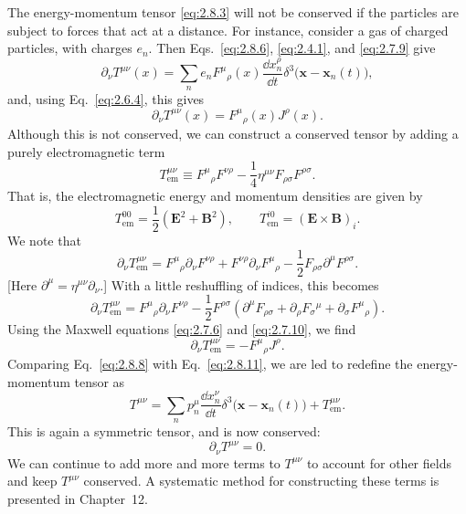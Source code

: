 The energy-momentum tensor \eqref{eq:2.8.3} will not be conserved if the
particles are subject to forces that act at a distance. For instance, consider
a gas of charged particles, with charges \(e_n\). Then
Eqs.~\eqref{eq:2.8.6}, \eqref{eq:2.4.1}, and \eqref{eq:2.7.9} give
\[
  \partial_\nu T^{\mu\nu}(x)
  =\sum_n e_nF^\mu{}_\rho(x)\frac{\dd x_n^\rho}{\dd t}
    \delta^3\bigl(\mathbf x-\mathbf x_n(t)\bigr),
\]
and, using Eq.~\eqref{eq:2.6.4}, this gives
\begin{equation}
  \partial_\nu T^{\mu\nu}(x)
  =F^\mu{}_\rho(x)J^\rho(x).
  \tag{2.8.8}\label{eq:2.8.8}
\end{equation}
Although this is not conserved, we can construct a conserved tensor by adding
a purely electromagnetic term
\begin{equation}
  T_{\mathrm{em}}^{\mu\nu}
  \equiv F^\mu{}_\rho F^{\nu\rho}
  -\frac14\eta^{\mu\nu}F_{\rho\sigma}F^{\rho\sigma}.
  \tag{2.8.9}\label{eq:2.8.9}
\end{equation}
That is, the electromagnetic energy and momentum densities are given by
\begin{equation}
  T_{\mathrm{em}}^{00}
  =\frac12(\mathbf E^2+\mathbf B^2),
  \qquad
  T_{\mathrm{em}}^{i0}=(\mathbf E\times\mathbf B)_i .
  \tag{2.8.10}\label{eq:2.8.10}
\end{equation}
We note that
\[
  \partial_\nu T_{\mathrm{em}}^{\mu\nu}
  =F^\mu{}_\rho\partial_\nu F^{\nu\rho}
   +F^{\nu\rho}\partial_\nu F^\mu{}_\rho
   -\frac12F_{\rho\sigma}\partial^\mu F^{\rho\sigma}.
\]
[Here \(\partial^\mu=\eta^{\mu\nu}\partial_\nu\).] With a little reshuffling
of indices, this becomes
\[
  \partial_\nu T_{\mathrm{em}}^{\mu\nu}
  =F^\mu{}_\rho\partial_\nu F^{\nu\rho}
   -\frac12F^{\rho\sigma}
   \left(
     \partial^\mu F_{\rho\sigma}
     +\partial_\rho F_\sigma{}^\mu
     +\partial_\sigma F^\mu{}_\rho
   \right).
\]
Using the Maxwell equations \eqref{eq:2.7.6} and \eqref{eq:2.7.10}, we find
\begin{equation}
  \partial_\nu T_{\mathrm{em}}^{\mu\nu}
  =-F^\mu{}_\rho J^\rho .
  \tag{2.8.11}\label{eq:2.8.11}
\end{equation}
Comparing Eq.~\eqref{eq:2.8.8} with Eq.~\eqref{eq:2.8.11}, we are led to
redefine the energy-momentum tensor as
\begin{equation}
  T^{\mu\nu}
  =\sum_n p_n^\mu\frac{\dd x_n^\nu}{\dd t}
    \delta^3\bigl(\mathbf x-\mathbf x_n(t)\bigr)
   +T_{\mathrm{em}}^{\mu\nu}.
  \tag{2.8.12}\label{eq:2.8.12}
\end{equation}
This is again a symmetric tensor, and is now conserved:
\begin{equation}
  \partial_\nu T^{\mu\nu}=0 .
  \tag{2.8.13}\label{eq:2.8.13}
\end{equation}
We can continue to add more and more terms to \(T^{\mu\nu}\) to account for
other fields and keep \(T^{\mu\nu}\) conserved. A systematic method for
constructing these terms is presented in Chapter~12.

